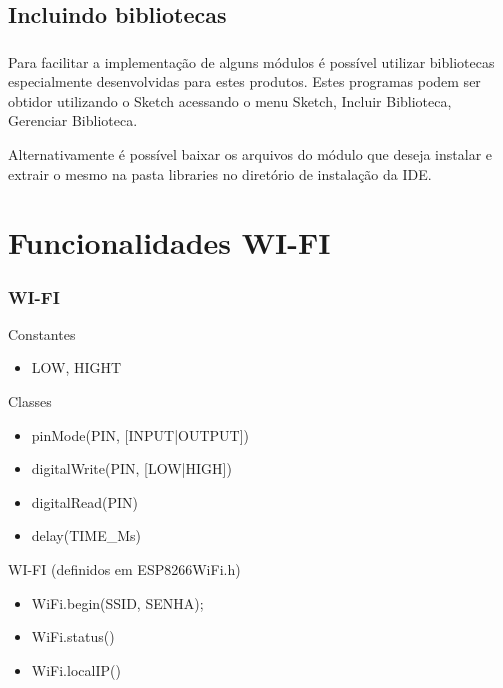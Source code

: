 \documentclass{beamer}
\begin{document}
\subsection{Incluindo bibliotecas}
\begin{frame}[fragile]
\frametitle{}

\begin{block}{}
Para facilitar a implementação de alguns módulos é possível utilizar bibliotecas especialmente desenvolvidas
para estes produtos. Estes programas podem ser obtidor utilizando o Sketch acessando o menu Sketch,
Incluir Biblioteca, Gerenciar Biblioteca.
\end{block}


\begin{block}{}
Alternativamente é possível baixar os arquivos do módulo que deseja instalar e extrair o mesmo na pasta 
libraries no diretório de instalação da IDE.
\end{block}

\end{frame}


\section{Funcionalidades WI-FI}

\begin{frame}[fragile]
\frametitle{WI-FI}

Constantes
\begin{itemize}
\item LOW, HIGHT
\end{itemize}

Classes
\begin{itemize}
\item pinMode(PIN, [INPUT|OUTPUT])
\item digitalWrite(PIN, [LOW|HIGH])
\item digitalRead(PIN)
\item delay(TIME\_Ms)
\end{itemize}

WI-FI (definidos em ESP8266WiFi.h)
\begin{itemize}
\item WiFi.begin(SSID, SENHA);
\item WiFi.status()
\item WiFi.localIP()
\end{itemize}

\end{frame}
\end{document}
